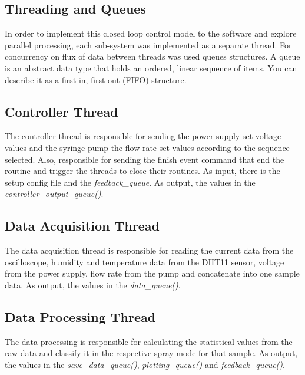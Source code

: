 \subsection{Threading and Queues}
\label{subsec:concurrency}

    In order to implement this closed loop control model to the software and explore parallel processing, each sub-system was implemented as a separate thread.
    For concurrency on flux of data between threads was used queues structures.
    A queue is an abstract data type that holds an ordered, linear sequence of items. You can describe it as a first in, first out (FIFO) structure.

    
    \subsection{Controller Thread}

        The controller thread is responsible for sending the power supply set voltage values and the syringe pump the flow rate set values according to the sequence selected.
        Also, responsible for sending the finish event command that end the routine and trigger the threads to close their routines.
        As input, there is the setup config file and the \emph{feedback\_queue}. As output, the values in the \emph{controller\_output\_queue()}.

    \subsection{Data Acquisition Thread}
    \label{subsec:data_aquisition}

        The data acquisition thread is responsible for reading the current data from the oscilloscope, humidity and temperature data from the DHT11 sensor, voltage from the power supply, flow rate from the pump and concatenate into one sample data.
        As output, the values in the \emph{data\_queue()}.

    \subsection{Data Processing Thread}

        The data processing is responsible for calculating the statistical values from the raw data and classify it in the respective spray mode for that sample.
        As output, the values in the \emph{save\_data\_queue()}, \emph{plotting\_queue()} and \emph{feedback\_queue()}.
    
